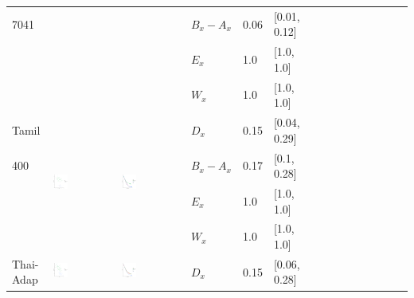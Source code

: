 \documentclass[11pt,letterpaper]{article}
\begin{document}
\begin{longtable}{lllllllllllllll}
7041  &    &    &  $B_x-A_x$  &  0.06  &  [0.01, 0.12]  \\ 
  &    &    &  $E_x$  &  1.0  &  [1.0, 1.0]  \\ 
  &    &    &  $W_x$  &  1.0  &  [1.0, 1.0]  \\ [10.25ex] \hline
Tamil  &  \multirow{4}{*}{\includegraphics[width=0.25\textwidth]{figures/Tamil-entropy-memory.pdf}}  &  \multirow{4}{*}{\includegraphics[width=0.25\textwidth]{figures/Tamil-listener-surprisal-memory.pdf}}  &  $D_x$  &  0.15  &  [0.04, 0.29]  \\ 
400  &    &    &  $B_x-A_x$  &  0.17  &  [0.1, 0.28]  \\ 
  &    &    &  $E_x$  &  1.0  &  [1.0, 1.0]  \\ 
  &    &    &  $W_x$  &  1.0  &  [1.0, 1.0]  \\ [10.25ex] \hline
Thai-Adap  &  \multirow{4}{*}{\includegraphics[width=0.25\textwidth]{figures/Thai-Adap-entropy-memory.pdf}}  &  \multirow{4}{*}{\includegraphics[width=0.25\textwidth]{figures/Thai-Adap-listener-surprisal-memory.pdf}}  &  $D_x$  &  0.15  &  [0.06, 0.28]  \\ 

\end{longtable}
\end{document}
